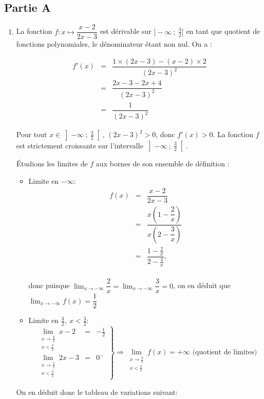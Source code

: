 \subsection*{Partie A}
\begin{enumerate}
\item La fonction $f:x \mapsto \dfrac{x-2}{2x-3}$ est dérivable sur $]-\infty~;~\frac32[$ en tant que quotient de fonctions polynomiales, le dénominateur étant non nul. On a :

\[\begin{array}{rcl}
f'(x) &=& \dfrac{1 \times (2x - 3) - (x - 2) \times 2}{(2x - 3)^2} \\
&=& \dfrac{2x - 3 - 2x + 4}{(2x - 3)^2}\\
&=& \dfrac{1}{(2x - 3)^2}
\end{array}\]

Pour tout $x \in \left]-\infty~;~\frac32\right[$,\: $(2x - 3)^2 > 0$, donc $f'(x) > 0$. La fonction $f$ est strictement croissante sur l'intervalle $\left]-\infty~;~\frac32\right[$.

Étudions les limites de $f$ aux bornes de son ensemble de définition :
\begin{itemize}
	\item Limite en $-\infty$: 
	\[\begin{matrix}
	f(x) &=&\dfrac{x-2}{2x-3} \\
	&=&\dfrac{x\left(1-\dfrac2{x}\right)}{x\left(2-\dfrac3{x}\right)}\\
	& =&\dfrac{1-\frac2{x}}{2-\frac3{x}}, \\

\end{matrix}\]

donc puisque $\displaystyle \lim_{x \to - \infty}\dfrac2{x} = \displaystyle \lim_{x \to - \infty}\dfrac3{x} = 0$, on en déduit que $\displaystyle \lim_{x \to - \infty} f(x)  = \dfrac12$ 

\item Limite en $\frac{3}{2}, \: x < \frac{3}{2}$: 
\[ 
\left.
\begin{matrix}
\displaystyle \lim_{\substack{x \to \frac32\\ x < \frac32}}x - 2 &=& -\frac12 \\
\displaystyle \lim_{\substack{x \to \frac32\\ x < \frac32}} 2x-3 &=& 0^-
\end{matrix}
\right\}
\Rightarrow \lim_{\substack{x \to \frac32\\ x < \frac32}} f(x)= +\infty \text{ (quotient de limites)} 
\]
\end{itemize}
On en déduit donc le tableau de variations suivant:


\end{enumerate}
